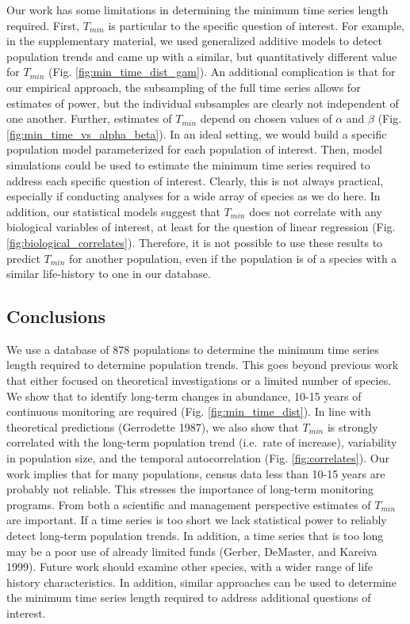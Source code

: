 \documentclass[12pt,]{article}
\begin{document}
Our work has some limitations in determining the minimum time series
length required. First, \(T_{min}\) is particular to the specific
question of interest. For example, in the supplementary material, we
used generalized additive models to detect population trends and came up
with a similar, but quantitatively different value for \(T_{min}\) (Fig.
\ref{fig:min_time_dist_gam}). An additional complication is that for our
empirical approach, the subsampling of the full time series allows for
estimates of power, but the individual subsamples are clearly not
independent of one another. Further, estimates of \(T_{min}\) depend on
chosen values of \(\alpha\) and \(\beta\) (Fig.
\ref{fig:min_time_vs_alpha_beta}). In an ideal setting, we would build a
specific population model parameterized for each population of interest.
Then, model simulations could be used to estimate the minimum time
series required to address each specific question of interest. Clearly,
this is not always practical, especially if conducting analyses for a
wide array of species as we do here. In addition, our statistical models
suggest that \(T_{min}\) does not correlate with any biological
variables of interest, at least for the question of linear regression
(Fig. \ref{fig:biological_correlates}). Therefore, it is not possible to
use these results to predict \(T_{min}\) for another population, even if
the population is of a species with a similar life-history to one in our
database.

\subsection{Conclusions}\label{conclusions}

We use a database of 878 populations to determine the minimum time
series length required to determine population trends. This goes beyond
previous work that either focused on theoretical investigations or a
limited number of species. We show that to identify long-term changes in
abundance, 10-15 years of continuous monitoring are required (Fig.
\ref{fig:min_time_dist}). In line with theoretical predictions
(Gerrodette 1987), we also show that \(T_{min}\) is strongly correlated
with the long-term population trend (i.e.~rate of increase), variability
in population size, and the temporal autocorrelation (Fig.
\ref{fig:correlates}). Our work implies that for many populations,
census data less than 10-15 years are probably not reliable. This
stresses the importance of long-term monitoring programs. From both a
scientific and management perspective estimates of \(T_{min}\) are
important. If a time series is too short we lack statistical power to
reliably detect long-term population trends. In addition, a time series
that is too long may be a poor use of already limited funds (Gerber,
DeMaster, and Kareiva 1999). Future work should examine other species,
with a wider range of life history characteristics. In addition, similar
approaches can be used to determine the minimum time series length
required to address additional questions of interest.
\end{document}
